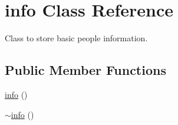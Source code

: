 \hypertarget{classinfo}{\section{info Class Reference}
\label{classinfo}
}


Class to store basic people information.  


\subsection*{Public Member Functions}
\begin{DoxyCompactItemize}
\item 
\hyperlink{classinfo_af6a5d3bc4c62a93aba929cdaa518688b}{info} ()
\item 
\hyperlink{classinfo_a7c4a6aa1f58ec72e25dcc62b7163e742}{$\sim$info} ()
\end{DoxyCompactItemize}
